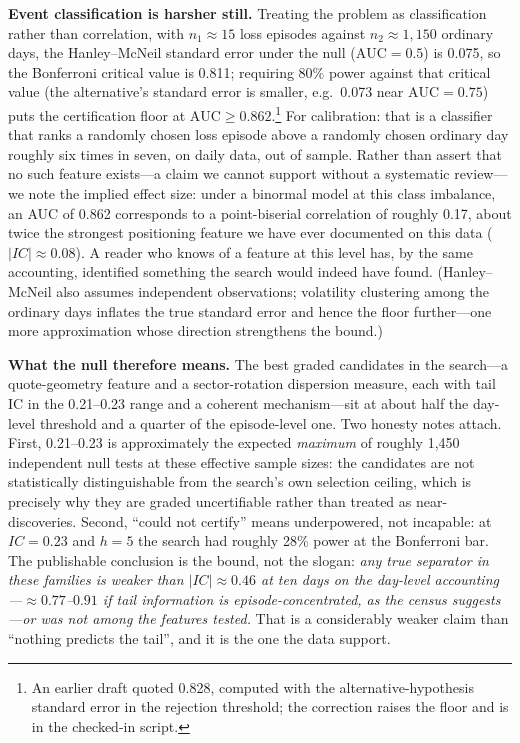 \documentclass[11pt]{article}
\begin{document}
\textbf{Event classification is harsher still.} Treating the problem as classification rather
than correlation, with $n_1 \approx 15$ loss episodes against $n_2 \approx 1{,}150$ ordinary
days, the Hanley--McNeil standard error \citep{hm} under the null ($\mathrm{AUC} = 0.5$) is
0.075, so the Bonferroni critical value is 0.811; requiring 80\% power against that critical
value (the alternative's standard error is smaller, e.g.\ 0.073 near $\mathrm{AUC} = 0.75$)
puts the certification floor at $\mathrm{AUC} \ge 0.862$.\footnote{An earlier draft quoted
0.828, computed with the alternative-hypothesis standard error in the rejection threshold;
the correction raises the floor and is in the checked-in script.} For calibration:
that is a classifier that ranks a randomly chosen loss episode above a randomly chosen ordinary
day roughly six times in seven, on daily data, out of sample. Rather than assert that no such
feature exists---a claim we cannot support without a systematic review---we note the implied
effect size: under a binormal model at this class imbalance, an AUC of 0.862 corresponds to a
point-biserial correlation of roughly 0.17, about twice the strongest positioning feature we
have ever documented on this data ($|IC| \approx 0.08$). A reader who knows of
a feature at this level has, by the same accounting, identified something the search would
indeed have found. (Hanley--McNeil also assumes independent observations; volatility
clustering among the ordinary days inflates the true standard error and hence the floor
further---one more approximation whose direction strengthens the bound.)

\textbf{What the null therefore means.} The best graded candidates in the search---a
quote-geometry feature and a sector-rotation dispersion measure, each with tail IC in the
0.21--0.23 range and a coherent mechanism---sit at about half the day-level threshold and a
quarter of the episode-level one. Two honesty notes attach. First, 0.21--0.23 is approximately
the expected \emph{maximum} of roughly 1{,}450 independent null tests at these effective sample
sizes: the candidates are not statistically distinguishable from the search's own selection
ceiling, which is precisely why they are graded uncertifiable rather than treated as
near-discoveries. Second, ``could not certify'' means underpowered, not incapable: at
$IC = 0.23$ and $h = 5$ the search had roughly 28\% power at the Bonferroni bar. The
publishable conclusion is the bound,
not the slogan: \emph{any true separator in these families is weaker than $|IC| \approx 0.46$
at ten days on the day-level accounting---$\approx 0.77$--$0.91$ if tail information is
episode-concentrated, as the census suggests---or was not among the features tested.} That is a
considerably weaker claim than ``nothing predicts the tail'', and it is the one the data
support.
\end{document}
